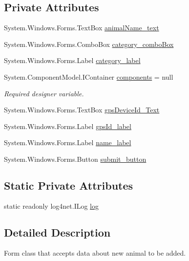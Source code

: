 \subsection*{Private Attributes}
\begin{DoxyCompactItemize}
\item 
System.\+Windows.\+Forms.\+Text\+Box \hyperlink{classWildlifeTrackingApp_1_1Add__GPS_a7fe95f974f803674d4c000c9f58a9e0a}{animal\+Name\+\_\+text}
\item 
System.\+Windows.\+Forms.\+Combo\+Box \hyperlink{classWildlifeTrackingApp_1_1Add__GPS_a8b1f399ade6c575e8562bc7d574d60d5}{category\+\_\+combo\+Box}
\item 
System.\+Windows.\+Forms.\+Label \hyperlink{classWildlifeTrackingApp_1_1Add__GPS_a793869e47486b75741e1fb09829f5bc7}{category\+\_\+label}
\item 
System.\+Component\+Model.\+I\+Container \hyperlink{classWildlifeTrackingApp_1_1Add__GPS_a02595f1c09713bb71dcb2fbbfc7ffa4b}{components} = null
\begin{DoxyCompactList}\small\item\em Required designer variable. \end{DoxyCompactList}\item 
System.\+Windows.\+Forms.\+Text\+Box \hyperlink{classWildlifeTrackingApp_1_1Add__GPS_a36c825f818fa9507eea338e176dcf4b3}{gps\+Device\+Id\+\_\+\+Text}
\item 
System.\+Windows.\+Forms.\+Label \hyperlink{classWildlifeTrackingApp_1_1Add__GPS_ad153415feb3be8aba8ed0e222b9a1e32}{gps\+Id\+\_\+label}
\item 
System.\+Windows.\+Forms.\+Label \hyperlink{classWildlifeTrackingApp_1_1Add__GPS_af6ba70393d92ce2a983bf47ab956b019}{name\+\_\+label}
\item 
System.\+Windows.\+Forms.\+Button \hyperlink{classWildlifeTrackingApp_1_1Add__GPS_a6c7fe113bfa091362451d2814c3c108a}{submit\+\_\+button}
\end{DoxyCompactItemize}
\subsection*{Static Private Attributes}
\begin{DoxyCompactItemize}
\item 
static readonly log4net.\+I\+Log \hyperlink{classWildlifeTrackingApp_1_1Add__GPS_ae6c6142b8525b2f4ac6ee6e003b3106f}{log}
\end{DoxyCompactItemize}


\subsection{Detailed Description}
Form class that accepts data about new animal to be added. 



